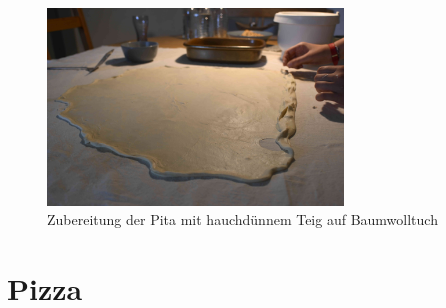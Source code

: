 \documentclass[a4paper, 12pt]{scrbook} 								%
\numberwithin{equation}{section} 									%
\begin{document}
			\begin{figure}[h]
				\centering
				\includegraphics[width = 0.7\textwidth]{media/pita_zubereitung.jpg}
				\caption{Zubereitung der Pita mit hauchdünnem Teig auf Baumwolltuch}
			\end{figure}

			\newpage


			\section{Pizza}	\label{pizza}
\end{document}
